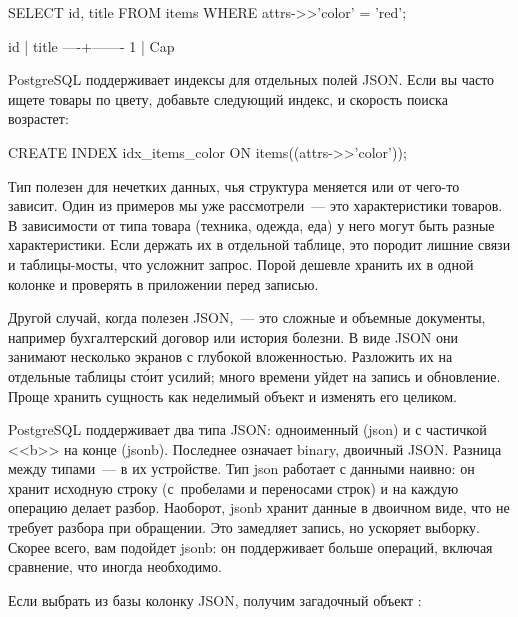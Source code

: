 \begin{english}
  \begin{sql}
SELECT id, title FROM items
WHERE attrs->>'color' = 'red';

 id | title
----+-------
  1 | Cap
  \end{sql}
\end{english}

PostgreSQL поддерживает индексы для отдельных полей JSON. Если вы часто ищете товары по цвету, добавьте следующий индекс, и скорость поиска возрастет:

\begin{english}
  \begin{sql}
CREATE INDEX idx_items_color
  ON items((attrs->>'color'));
  \end{sql}
\end{english}

Тип  полезен для нечетких данных, чья структура меняется или от чего-то зависит. Один из примеров мы уже рассмотрели~--- это характеристики товаров. В зависимости от типа товара (техника, одежда, еда) у него могут быть разные характеристики. Если держать их в отдельной таблице, это породит лишние связи и таблицы-мосты, что усложнит запрос. Порой дешевле хранить их в одной колонке  и проверять в приложении перед записью.

Другой случай, когда полезен JSON,~--- это сложные и объемные документы, например бухгалтерский договор или история болезни. В виде JSON они занимают несколько экранов с глубокой вложенностью. Разложить их на отдельные таблицы ст\'{о}ит усилий; много времени уйдет на запись и обновление. Проще хранить сущность как неделимый объект и изменять его целиком.


PostgreSQL поддерживает два типа JSON: одноименный (json) и с частичкой <<b>> на конце (jsonb). Последнее означает binary, двоичный JSON. Разница между типами~--- в их устройстве. Тип json работает с данными наивно: он хранит исходную строку (с~пробелами и переносами строк) и на каждую операцию делает разбор. Наоборот, jsonb хранит данные в двоичном виде, что не требует разбора при обращении. Это замедляет запись, но ускоряет выборку. Скорее всего, вам подойдет jsonb: он поддерживает больше операций, включая сравнение, что иногда необходимо.


Если выбрать из базы колонку JSON, получим загадочный объект :

